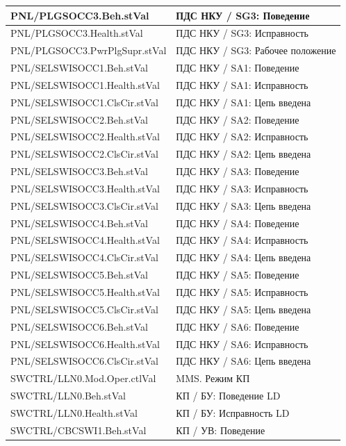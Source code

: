 \begin{longtable}{|>{\raggedright\arraybackslash}m{}|>{\raggedright\arraybackslash}m{}|}
\hline
PNL/PLGSOCC3.Beh.stVal & ПДС НКУ / SG3: Поведение \\
\hline
PNL/PLGSOCC3.Health.stVal & ПДС НКУ / SG3: Исправность \\
\hline
PNL/PLGSOCC3.PwrPlgSupr.stVal & ПДС НКУ / SG3: Рабочее положение \\
\hline
PNL/SELSWISOCC1.Beh.stVal & ПДС НКУ / SA1: Поведение \\
\hline
PNL/SELSWISOCC1.Health.stVal & ПДС НКУ / SA1: Исправность \\
\hline
PNL/SELSWISOCC1.ClsCir.stVal & ПДС НКУ / SA1: Цепь введена \\
\hline
PNL/SELSWISOCC2.Beh.stVal & ПДС НКУ / SA2: Поведение \\
\hline
PNL/SELSWISOCC2.Health.stVal & ПДС НКУ / SA2: Исправность \\
\hline
PNL/SELSWISOCC2.ClsCir.stVal & ПДС НКУ / SA2: Цепь введена \\
\hline
PNL/SELSWISOCC3.Beh.stVal & ПДС НКУ / SA3: Поведение \\
\hline
PNL/SELSWISOCC3.Health.stVal & ПДС НКУ / SA3: Исправность \\
\hline
PNL/SELSWISOCC3.ClsCir.stVal & ПДС НКУ / SA3: Цепь введена \\
\hline
PNL/SELSWISOCC4.Beh.stVal & ПДС НКУ / SA4: Поведение \\
\hline
PNL/SELSWISOCC4.Health.stVal & ПДС НКУ / SA4: Исправность \\
\hline
PNL/SELSWISOCC4.ClsCir.stVal & ПДС НКУ / SA4: Цепь введена \\
\hline
PNL/SELSWISOCC5.Beh.stVal & ПДС НКУ / SA5: Поведение \\
\hline
PNL/SELSWISOCC5.Health.stVal & ПДС НКУ / SA5: Исправность \\
\hline
PNL/SELSWISOCC5.ClsCir.stVal & ПДС НКУ / SA5: Цепь введена \\
\hline
PNL/SELSWISOCC6.Beh.stVal & ПДС НКУ / SA6: Поведение \\
\hline
PNL/SELSWISOCC6.Health.stVal & ПДС НКУ / SA6: Исправность \\
\hline
PNL/SELSWISOCC6.ClsCir.stVal & ПДС НКУ / SA6: Цепь введена \\
\hline
SWCTRL/LLN0.Mod.Oper.ctlVal & MMS. Режим КП \\
\hline
SWCTRL/LLN0.Beh.stVal & КП / БУ: Поведение LD \\
\hline
SWCTRL/LLN0.Health.stVal & КП / БУ: Исправность LD \\
\hline
SWCTRL/CBCSWI1.Beh.stVal & КП / УВ: Поведение \\

\end{longtable}
